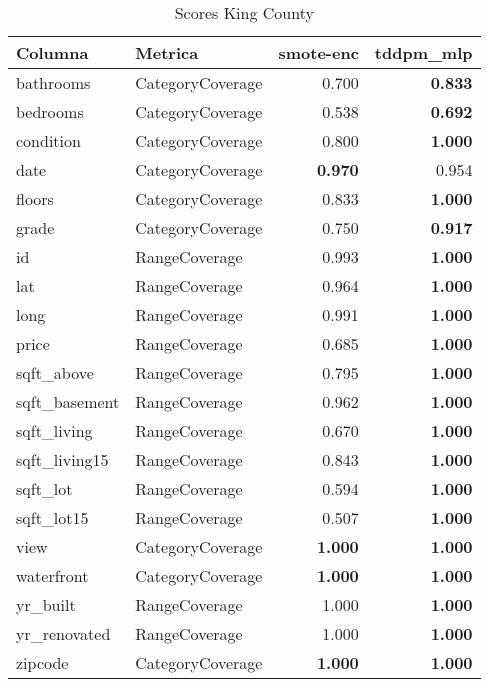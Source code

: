 \begin{table}[H]
\centering
\caption{Scores King County}
\label{table-coverage-king county-a-1}
\begin{tabular}{|l|l|r|r|}
\hline
\rowcolor[gray]{0.8}
Columna & Metrica & smote-enc & tddpm\_mlp \\
\hline bathrooms & CategoryCoverage & 0.700 & \bfseries 0.833 \\
\hline bedrooms & CategoryCoverage & 0.538 & \bfseries 0.692 \\
\hline condition & CategoryCoverage & 0.800 & \bfseries 1.000 \\
\hline date & CategoryCoverage & \bfseries 0.970 & 0.954 \\
\hline floors & CategoryCoverage & 0.833 & \bfseries 1.000 \\
\hline grade & CategoryCoverage & 0.750 & \bfseries 0.917 \\
\hline id & RangeCoverage & 0.993 & \bfseries 1.000 \\
\hline lat & RangeCoverage & 0.964 & \bfseries 1.000 \\
\hline long & RangeCoverage & 0.991 & \bfseries 1.000 \\
\hline price & RangeCoverage & 0.685 & \bfseries 1.000 \\
\hline sqft\_above & RangeCoverage & 0.795 & \bfseries 1.000 \\
\hline sqft\_basement & RangeCoverage & 0.962 & \bfseries 1.000 \\
\hline sqft\_living & RangeCoverage & 0.670 & \bfseries 1.000 \\
\hline sqft\_living15 & RangeCoverage & 0.843 & \bfseries 1.000 \\
\hline sqft\_lot & RangeCoverage & 0.594 & \bfseries 1.000 \\
\hline sqft\_lot15 & RangeCoverage & 0.507 & \bfseries 1.000 \\
\hline view & CategoryCoverage & \bfseries 1.000 & \bfseries 1.000 \\
\hline waterfront & CategoryCoverage & \bfseries 1.000 & \bfseries 1.000 \\
\hline yr\_built & RangeCoverage & 1.000 & \bfseries 1.000 \\
\hline yr\_renovated & RangeCoverage & 1.000 & \bfseries 1.000 \\
\hline zipcode & CategoryCoverage & \bfseries 1.000 & \bfseries 1.000 \\
\hline
\end{tabular}
\end{table}
